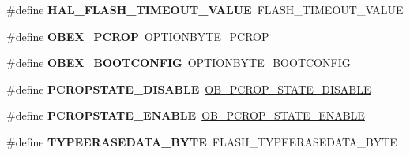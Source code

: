 \begin{DoxyCompactItemize}
\item 
\#define {\bfseries H\+A\+L\+\_\+\+F\+L\+A\+S\+H\+\_\+\+T\+I\+M\+E\+O\+U\+T\+\_\+\+V\+A\+L\+UE}~F\+L\+A\+S\+H\+\_\+\+T\+I\+M\+E\+O\+U\+T\+\_\+\+V\+A\+L\+UE\hypertarget{group___h_a_l___f_l_a_s_h___aliased___defines_ga0c295495be438d4092e29488ac3ee897}{}\label{group___h_a_l___f_l_a_s_h___aliased___defines_ga0c295495be438d4092e29488ac3ee897}

\item 
\#define {\bfseries O\+B\+E\+X\+\_\+\+P\+C\+R\+OP}~\hyperlink{group___f_l_a_s_h_ex___advanced___option___type_gade16326e09bd923b54f1ec8622a7bc4b}{O\+P\+T\+I\+O\+N\+B\+Y\+T\+E\+\_\+\+P\+C\+R\+OP}\hypertarget{group___h_a_l___f_l_a_s_h___aliased___defines_ga1de788f8cf04b70320aaebf3388e638c}{}\label{group___h_a_l___f_l_a_s_h___aliased___defines_ga1de788f8cf04b70320aaebf3388e638c}

\item 
\#define {\bfseries O\+B\+E\+X\+\_\+\+B\+O\+O\+T\+C\+O\+N\+F\+IG}~O\+P\+T\+I\+O\+N\+B\+Y\+T\+E\+\_\+\+B\+O\+O\+T\+C\+O\+N\+F\+IG\hypertarget{group___h_a_l___f_l_a_s_h___aliased___defines_ga79284d41c929869394172fc526ff3d7e}{}\label{group___h_a_l___f_l_a_s_h___aliased___defines_ga79284d41c929869394172fc526ff3d7e}

\item 
\#define {\bfseries P\+C\+R\+O\+P\+S\+T\+A\+T\+E\+\_\+\+D\+I\+S\+A\+B\+LE}~\hyperlink{group___f_l_a_s_h_ex___p_c_r_o_p___state_ga9e235dd15da1d1e73b71bd8d82004ca5}{O\+B\+\_\+\+P\+C\+R\+O\+P\+\_\+\+S\+T\+A\+T\+E\+\_\+\+D\+I\+S\+A\+B\+LE}\hypertarget{group___h_a_l___f_l_a_s_h___aliased___defines_ga09f7800119c1971e339df62f11beab14}{}\label{group___h_a_l___f_l_a_s_h___aliased___defines_ga09f7800119c1971e339df62f11beab14}

\item 
\#define {\bfseries P\+C\+R\+O\+P\+S\+T\+A\+T\+E\+\_\+\+E\+N\+A\+B\+LE}~\hyperlink{group___f_l_a_s_h_ex___p_c_r_o_p___state_ga585627ceedceee7da01da4d3ca753108}{O\+B\+\_\+\+P\+C\+R\+O\+P\+\_\+\+S\+T\+A\+T\+E\+\_\+\+E\+N\+A\+B\+LE}\hypertarget{group___h_a_l___f_l_a_s_h___aliased___defines_ga9e086afe58f178c3e86526666bedc217}{}\label{group___h_a_l___f_l_a_s_h___aliased___defines_ga9e086afe58f178c3e86526666bedc217}

\item 
\#define {\bfseries T\+Y\+P\+E\+E\+R\+A\+S\+E\+D\+A\+T\+A\+\_\+\+B\+Y\+TE}~F\+L\+A\+S\+H\+\_\+\+T\+Y\+P\+E\+E\+R\+A\+S\+E\+D\+A\+T\+A\+\_\+\+B\+Y\+TE\hypertarget{group___h_a_l___f_l_a_s_h___aliased___defines_ga4b3d9b5629b76e57da896b4b7f95d3d7}{}\label{group___h_a_l___f_l_a_s_h___aliased___defines_ga4b3d9b5629b76e57da896b4b7f95d3d7}


\end{DoxyCompactItemize}
